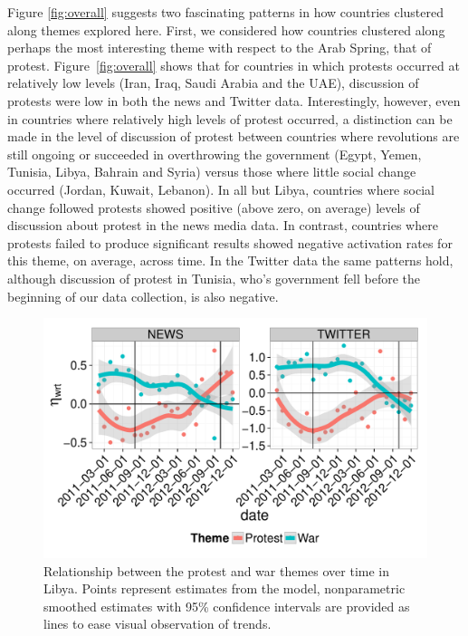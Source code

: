 Figure \ref{fig:overall} suggests two fascinating patterns in how countries clustered along themes explored here. First, we considered how countries clustered along perhaps the most interesting theme with respect to the Arab Spring, that of protest.  Figure~\ref{fig:overall} shows that for countries in which protests occurred at relatively low levels (Iran, Iraq, Saudi Arabia and the UAE), discussion of protests were low in both the news and Twitter data. Interestingly,  however, even in countries where relatively high levels of protest occurred, a distinction can be made in the level of discussion of protest between countries where revolutions are still ongoing or succeeded in overthrowing the government (Egypt, Yemen, Tunisia, Libya, Bahrain and Syria) versus those where little social change occurred (Jordan, Kuwait, Lebanon).  In all but Libya, countries where social change followed protests showed positive (above zero, on average) levels of discussion about protest in the news media data. In contrast, countries where protests failed to produce significant results showed negative activation rates for this theme, on average, across time.  In the Twitter data the same patterns hold, although discussion of protest in Tunisia, who's government fell before the beginning of our data collection, is also negative.

\begin{figure}[t]
	\centering
	\includegraphics[width=.5\textwidth]{imgs/lib_protest_viol}
	\caption{Relationship between the protest and war themes over time in Libya. Points represent estimates from the model, nonparametric smoothed estimates with 95\% confidence intervals are provided as lines to ease visual observation of trends.}
	\label{fig:prot_viol}
\end{figure}

